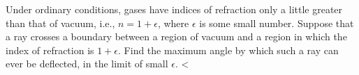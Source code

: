 Under ordinary conditions, gases have indices of refraction only
a little greater than that of vacuum, i.e., $n=1+\epsilon$, where
$\epsilon$ is some small number. 
Suppose that a ray crosses a boundary between a region of vacuum
and a region in which the index of refraction is $1+\epsilon$.
Find the maximum angle by which such a ray can ever be deflected,
in the limit of small $\epsilon$.
<%
